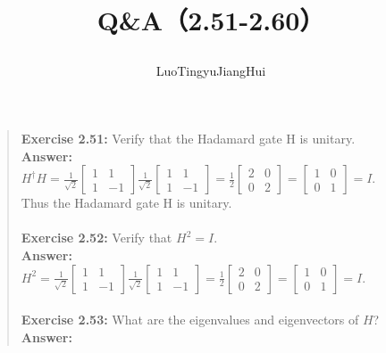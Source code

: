 \documentclass[UTF8]{ctexart}
\begin{document}
	\title{\textbf{Q\&A（2.51-2.60）}\\[1ex]\begin{large}
		\end{large}}
	\author{LuoTingyu\quad JiangHui}
	\maketitle
\begin{quote}
\textbf{Exercise 2.51: } Verify that the Hadamard gate H is unitary.
\\
\textbf{Answer:}\\
$H^{\dagger}H=\frac{1}{\sqrt{2}}\begin{bmatrix}
	1 & 1 \\1 & -1
\end{bmatrix}
\frac{1}{\sqrt{2}}\begin{bmatrix}
	1 & 1 \\1 & -1
\end{bmatrix}
=\frac{1}{2}\begin{bmatrix}
	2 & 0 \\0 & 2
\end{bmatrix}
=\begin{bmatrix}
	1 & 0 \\0 & 1
\end{bmatrix}
=I$.
\\
Thus the Hadamard gate H is unitary.
\\
\\
\textbf{Exercise 2.52:  } Verify that $H^{2} = I.$
\\
\textbf{Answer:}\\
$H^{2}=\frac{1}{\sqrt{2}}\begin{bmatrix}
	1 & 1 \\1 & -1
\end{bmatrix}
\frac{1}{\sqrt{2}}\begin{bmatrix}
	1 & 1 \\1 & -1
\end{bmatrix}
=\frac{1}{2}\begin{bmatrix}
	2 & 0 \\0 & 2
\end{bmatrix}
=\begin{bmatrix}
	1 & 0 \\0 & 1
\end{bmatrix}
=I$.
\\
\\
\textbf{Exercise 2.53:} What are the eigenvalues and eigenvectors of $H$?
\\
\textbf{Answer:}\\

\end{quote}
\end{document}

